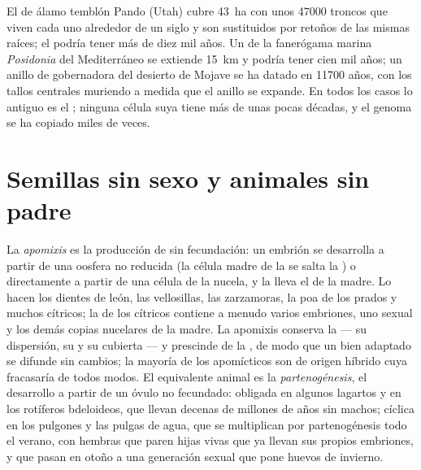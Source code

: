 \begin{example}\label{ex:b2:asexual-reproduction:oldest}
El  de álamo temblón Pando (Utah) cubre \qty{43}{ha} con unos
\num{47000} troncos que viven cada uno alrededor de un siglo y son
sustituidos por retoños de las mismas raíces; el  podría tener más
de diez mil años. Un  de la fanerógama marina \emph{Posidonia} del
Mediterráneo se extiende \qty{15}{km} y podría tener cien mil años; un
anillo de gobernadora del desierto de Mojave se ha datado en
\num{11700} años, con los tallos centrales muriendo a medida que el
anillo se expande. En todos los casos lo antiguo es el ; ninguna
célula suya tiene más de unas pocas décadas, y el genoma se ha copiado
miles de veces.
\end{example}

\section{Semillas sin sexo y animales sin padre}

\begin{definition}[Apomixis]\label{def:b2:asexual-reproduction:apomixis}
La \emph{apomixis} es la producción de  sin fecundación: un
embrión se desarrolla a partir de una oosfera no reducida (la célula
madre de la  se salta la ) o directamente a partir de una
célula de la nucela, y la  lleva el  de la madre. Lo hacen
los dientes de león, las vellosillas, las zarzamoras, la poa de los
prados y muchos cítricos; la  de los cítricos contiene a menudo
varios embriones, uno sexual y los demás copias nucelares de la madre.
La apomixis conserva la  --- su dispersión, su  y su
cubierta --- y prescinde de la , de modo que un  bien
adaptado se difunde sin cambios; la mayoría de los apomícticos son
 de origen híbrido cuya  fracasaría de todos modos. El
equivalente animal es la \emph{partenogénesis}, el desarrollo a partir de
un óvulo no fecundado: obligada en algunos lagartos y en los rotíferos
bdeloideos, que llevan decenas de millones de años sin machos; cíclica en
los pulgones y las pulgas de agua, que se multiplican por partenogénesis
todo el verano, con hembras que paren hijas vivas que ya llevan sus
propios embriones, y que pasan en otoño a una generación sexual que pone
huevos de invierno.
\end{definition}


